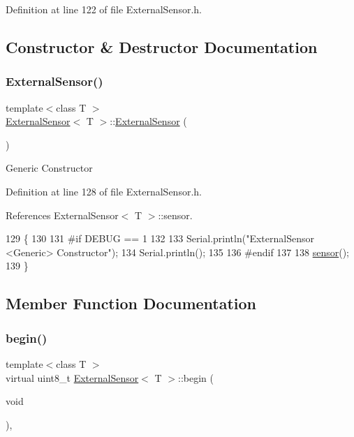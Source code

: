 Definition at line 122 of file External\+Sensor.\+h.



\subsection{Constructor \& Destructor Documentation}
\mbox{\label{classExternalSensor_a8b991447fba33253103d06198b838751}} 
\subsubsection{\texorpdfstring{External\+Sensor()}{ExternalSensor()}}
{\footnotesize\ttfamily template$<$class T $>$ \\
\hyperlink{classExternalSensor}{External\+Sensor}$<$ T $>$\+::\hyperlink{classExternalSensor}{External\+Sensor} (\begin{DoxyParamCaption}{ }\end{DoxyParamCaption})\hspace{0.3cm}{\ttfamily [inline]}}

Generic Constructor 

Definition at line 128 of file External\+Sensor.\+h.



References External\+Sensor$<$ T $>$\+::sensor.


\begin{DoxyCode}
129     \{
130     
131 \textcolor{preprocessor}{    #if DEBUG == 1 }
132 
133         Serial.println(\textcolor{stringliteral}{"ExternalSensor <Generic> Constructor"});
134         Serial.println();
135     
136 \textcolor{preprocessor}{    #endif}
137 
138         \hyperlink{classExternalSensor_a6e1f518119abe08c14b498ce24a7e1b3}{sensor}();
139     \}
\end{DoxyCode}


\subsection{Member Function Documentation}
\mbox{\label{classExternalSensor_ab6fe1379d55b656a048e0fba1e0a32e6}} 
\subsubsection{\texorpdfstring{begin()}{begin()}}
{\footnotesize\ttfamily template$<$class T $>$ \\
virtual uint8\+\_\+t \hyperlink{classExternalSensor}{External\+Sensor}$<$ T $>$\+::begin (\begin{DoxyParamCaption}\item[{void}]{ }\end{DoxyParamCaption})\hspace{0.3cm}{\ttfamily [inline]}, {\ttfamily [virtual]}}

